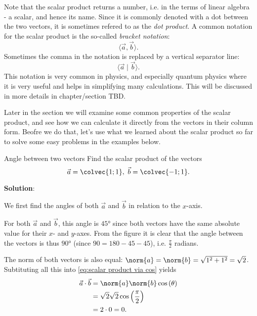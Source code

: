 Note that the scalar product returns a number, i.e. in the terms of linear algebra - a scalar, and hence its name. Since it is commonly denoted with a dot between the two vectors, it is sometimes refered to as the \emph{dot product}. A common notation for the scalar product is the so-called \emph{bracket notation}:
\[
	\langle \vec{a},\vec{b} \rangle.
\]
Sometimes the comma in the notation is replaced by a vertical separator line:
\[
	\langle \vec{a}\mid\vec{b} \rangle.
\]
This notation is very common in physics, and especially quantum physics where it is very useful and helps in simplifying many calculations. This will be discussed in more details in chapter/section TBD.

Later in the section we will examine some common properties of the scalar product, and see how we can calculate it directly from the vectors in their column form. Beofre we do that, let's use what we learned about the scalar product so far to solve some easy problems in the examples below.

\begin{example}{Angle between two vectors}{}
	Find the scalar product of the vectors
	\[
		\vec{a} = \colvec{1;1},\ \vec{b}=\colvec{-1;1}.
	\]

	\textbf{Solution}:

	We first find the angles of both $\vec{a}$ and $\vec{b}$ in relation to the $x$-axis.

	\begin{figure}[H]
		\centering
	\end{figure}

	For both $\vec{a}$ and $\vec{b}$, this angle is $\ang{45}$ since both vectors have the same absolute value for their $x$- and $y$-axes. From the figure it is clear that the angle between the vectors is thus $\ang{90}$ (since $90=180-45-45$), i.e. $\frac{\pi}{2}$ radians.

	The norm of both vectors is also equal: $\norm{a}=\norm{b}=\sqrt{1^{2}+1^{2}}=\sqrt{2}$. Subtituting all this into \autoref{eq:scalar product via cos} yields
	\begin{align*}
		\vec{a}\cdot\vec{b} &= \norm{a}\norm{b}\cos\left(\theta\right)\\
		&= \sqrt{2}\sqrt{2}\cos\left( \frac{\pi}{2} \right)\\
		&= 2\cdot0 = 0.
	\end{align*}
\end{example}

